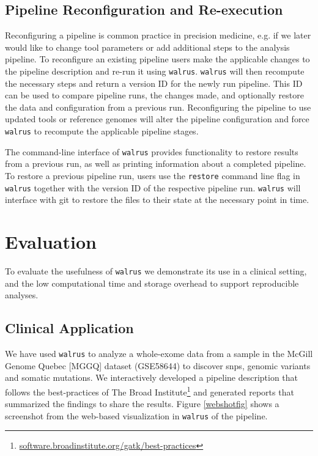 \subsection{Pipeline Reconfiguration and Re-execution}
Reconfiguring a pipeline is common practice in precision medicine, e.g. if we
later would like to change tool parameters or add additional steps to the
analysis pipeline. To reconfigure an existing pipeline users make the applicable
changes to the pipeline description and re-run it using \texttt{walrus}.
\texttt{walrus} will then recompute the necessary steps and return a version ID
for the newly run pipeline. This ID can be used to compare pipeline runs, the
changes made, and optionally restore the data and configuration from a previous
run.  Reconfiguring the pipeline to use updated tools or reference genomes will
alter the pipeline configuration and force \texttt{walrus} to recompute the
applicable pipeline stages. 

The command-line interface of \texttt{walrus} provides functionality to restore
results from a previous run, as well as printing information about a completed
pipeline.  To restore a previous pipeline run, users use the \texttt{restore}
command line flag in \texttt{walrus} together with the version ID of the
respective pipeline run. \texttt{walrus} will interface with git to restore the
files to their state at the necessary point in time.

\section{Evaluation}
To evaluate the usefulness of \texttt{walrus} we demonstrate its use in a
clinical setting, and the low computational time and storage overhead to support
reproducible analyses.

\subsection{Clinical Application} 
We have used \texttt{walrus} to analyze a whole-exome data from a sample
in the McGill Genome Quebec [MGGQ] dataset (GSE58644)\cite{tofigh2014prognostic}
to discover \glspl{snp}, genomic variants and somatic mutations. We
interactively developed a pipeline description that follows the best-practices
of The Broad
Institute\footnote{\url{software.broadinstitute.org/gatk/best-practices}} and
generated reports that summarized the findings to share the results. Figure
\ref{webshotfig} shows a screenshot from the web-based visualization in
\texttt{walrus} of the pipeline. 

